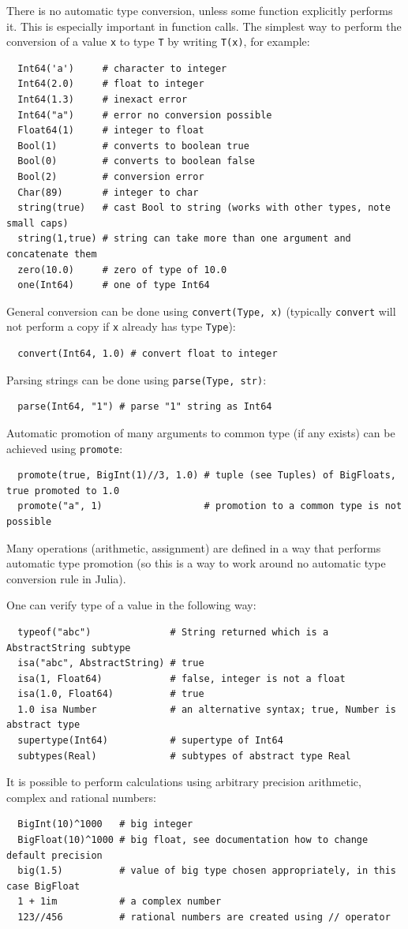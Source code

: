 \documentclass[10pt,a4paper]{article}
\begin{document}
There is no automatic type conversion, unless some function explicitly performs
it. This is especially important in function calls. The simplest way to perform
the conversion of a value \lstinline|x| to type \lstinline|T| by writing
\lstinline|T(x)|, for example:
\begin{lstlisting}
  Int64('a')     # character to integer
  Int64(2.0)     # float to integer
  Int64(1.3)     # inexact error
  Int64("a")     # error no conversion possible
  Float64(1)     # integer to float
  Bool(1)        # converts to boolean true
  Bool(0)        # converts to boolean false
  Bool(2)        # conversion error
  Char(89)       # integer to char
  string(true)   # cast Bool to string (works with other types, note small caps)
  string(1,true) # string can take more than one argument and concatenate them
  zero(10.0)     # zero of type of 10.0
  one(Int64)     # one of type Int64
\end{lstlisting}
General conversion can be done using \lstinline|convert(Type, x)| (typically
\lstinline|convert| will not perform a copy if \lstinline|x| already has type
\lstinline|Type|):
\begin{lstlisting}
  convert(Int64, 1.0) # convert float to integer
\end{lstlisting}
Parsing strings can be done using \lstinline|parse(Type, str)|:
\begin{lstlisting}
  parse(Int64, "1") # parse "1" string as Int64
\end{lstlisting}
Automatic promotion of many arguments to common type (if any exists) can be
achieved using \lstinline|promote|:
\begin{lstlisting}
  promote(true, BigInt(1)//3, 1.0) # tuple (see Tuples) of BigFloats, true promoted to 1.0
  promote("a", 1)                  # promotion to a common type is not possible
\end{lstlisting}
Many operations (arithmetic, assignment) are defined in a way that performs
automatic type promotion (so this is a way to work around no automatic type
conversion rule in Julia).

One can verify type of a value in the following way:
\begin{lstlisting}
  typeof("abc")              # String returned which is a AbstractString subtype
  isa("abc", AbstractString) # true
  isa(1, Float64)            # false, integer is not a float
  isa(1.0, Float64)          # true
  1.0 isa Number             # an alternative syntax; true, Number is abstract type
  supertype(Int64)           # supertype of Int64
  subtypes(Real)             # subtypes of abstract type Real
\end{lstlisting}
It is possible to perform calculations using arbitrary precision arithmetic,
complex and rational numbers:
\begin{lstlisting}
  BigInt(10)^1000   # big integer
  BigFloat(10)^1000 # big float, see documentation how to change default precision
  big(1.5)          # value of big type chosen appropriately, in this case BigFloat
  1 + 1im           # a complex number
  123//456          # rational numbers are created using // operator
\end{lstlisting}
\end{document}
